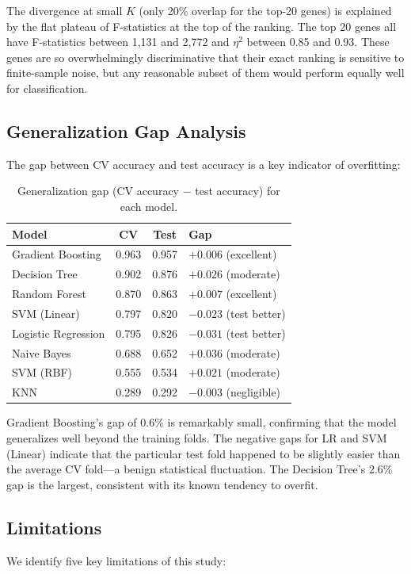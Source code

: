 \documentclass{article}
\begin{document}
The divergence at small $K$ (only 20\% overlap for the top-20 genes) is explained by the flat plateau of F-statistics at the top of the ranking. The top 20 genes all have F-statistics between 1{,}131 and 2{,}772 and $\eta^2$ between 0.85 and 0.93. These genes are so overwhelmingly discriminative that their exact ranking is sensitive to finite-sample noise, but any reasonable subset of them would perform equally well for classification.

\subsection{Generalization Gap Analysis}
The gap between CV accuracy and test accuracy is a key indicator of overfitting:

\begin{table}[H]
\caption{Generalization gap (CV accuracy $-$ test accuracy) for each model.}
\begin{center}
\begin{tabular}{lccl}
\toprule
\textbf{Model} & \textbf{CV} & \textbf{Test} & \textbf{Gap}\\
\midrule
Gradient Boosting & 0.963 & 0.957 & $+0.006$ (excellent)\\
Decision Tree & 0.902 & 0.876 & $+0.026$ (moderate)\\
Random Forest & 0.870 & 0.863 & $+0.007$ (excellent)\\
SVM (Linear) & 0.797 & 0.820 & $-0.023$ (test better)\\
Logistic Regression & 0.795 & 0.826 & $-0.031$ (test better)\\
Naive Bayes & 0.688 & 0.652 & $+0.036$ (moderate)\\
SVM (RBF) & 0.555 & 0.534 & $+0.021$ (moderate)\\
KNN & 0.289 & 0.292 & $-0.003$ (negligible)\\
\bottomrule
\end{tabular}
\end{center}
\end{table}

Gradient Boosting's gap of 0.6\% is remarkably small, confirming that the model generalizes well beyond the training folds. The negative gaps for LR and SVM (Linear) indicate that the particular test fold happened to be slightly easier than the average CV fold---a benign statistical fluctuation. The Decision Tree's 2.6\% gap is the largest, consistent with its known tendency to overfit.

\subsection{Limitations}
We identify five key limitations of this study:
\end{document}
